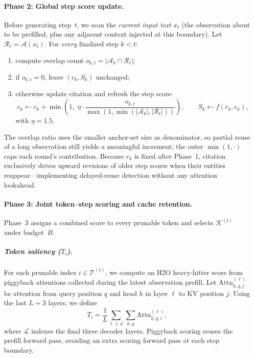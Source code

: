 \documentclass[11pt]{article}
\begin{document}
\paragraph{Phase 2: Global step score update.}
Before generating step~$t$, we scan the \emph{current input text} $x_t$ (the observation about to be prefilled, plus any adjacent context injected at this boundary).
Let $\mathcal{R}_t=\mathcal{A}(x_t)$.
For \emph{every} finalized step $k<t$:
\begin{enumerate}[leftmargin=*, nosep]
    \item compute overlap count $o_{k,t}=|\mathcal{A}_k\cap\mathcal{R}_t|$;
    \item if $o_{k,t}=0$, leave $(c_k,S_k)$ unchanged;
    \item otherwise update citation and refresh the step score:
    \begin{equation}
    \label{eq:cite}
    c_k \leftarrow c_k + \min\!\left(1,\;\eta\cdot\frac{o_{k,t}}{\max\!\left(1,\min(|\mathcal{A}_k|,|\mathcal{R}_t|)\right)}\right),
    \qquad
    S_k \leftarrow f(r_k, c_k),
    \end{equation}
    with $\eta=1.5$.
\end{enumerate}
The overlap ratio uses the smaller anchor-set size as denominator, so partial reuse of a long observation still yields a meaningful increment; the outer $\min(1,\cdot)$ caps each round's contribution.
Because $r_k$ is fixed after Phase~1, citation exclusively drives upward revisions of older step scores when their entities reappear---implementing delayed-reuse detection without any attention lookahead.

\paragraph{Phase 3: Joint token--step scoring and cache retention.}
Phase~3 assigns a combined score to every prunable token and selects $\mathcal{K}^{(t)}$ under budget~$B$.

\subparagraph{Token saliency ($T_i$).}
For each prunable index $i\in\mathcal{T}^{(t)}$, we compute an H2O heavy-hitter score from piggyback attentions collected during the latest observation prefill.
Let $\mathrm{Attn}^{(\ell)}_{h,q,j}$ be attention from query position $q$ and head $h$ in layer $\ell$ to KV position $j$.
Using the last $L=3$ layers, we define
\begin{equation}
\label{eq:h2o}
T_i = \frac{1}{L}\sum_{\ell\in\mathcal{L}}\sum_{h,q}\mathrm{Attn}^{(\ell)}_{h,q,i},
\end{equation}
where $\mathcal{L}$ indexes the final three decoder layers.
Piggyback scoring reuses the prefill forward pass, avoiding an extra scoring forward pass at each step boundary.
\end{document}
